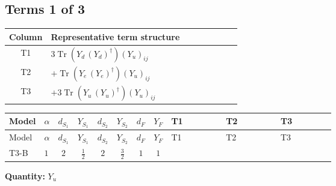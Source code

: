 \documentclass[8pt]{article}
\begin{document}
\begin{landscape}
\subsection*{Terms 1 of 3}
\begin{center}
\begin{tabular}{@{}c >{\raggedright\arraybackslash}p{0.82\linewidth}@{}}
\toprule
Column & Representative term structure \\
\midrule
T1 & \(\displaystyle 3 \operatorname{Tr}\!\left({Y_d}\,\left({Y_d}\right)^{\dagger}\right) \left({Y_u}\right)_{ij}\) \\
\midrule
T2 & \(\displaystyle +\operatorname{Tr}\!\left({Y_e}\,\left({Y_e}\right)^{\dagger}\right) \left({Y_u}\right)_{ij}\) \\
\midrule
T3 & \(\displaystyle +3 \operatorname{Tr}\!\left({Y_u}\,\left({Y_u}\right)^{\dagger}\right) \left({Y_u}\right)_{ij}\) \\
\midrule
\bottomrule
\end{tabular}
\end{center}
\smallskip
\tiny
\begin{longtable}{@{}llcccccc >{\raggedright\arraybackslash}p{0.21\linewidth} >{\raggedright\arraybackslash}p{0.21\linewidth} >{\raggedright\arraybackslash}p{0.21\linewidth}@{}}
\toprule
Model & $\alpha$ & $d_{S_1}$ & $Y_{S_1}$ & $d_{S_2}$ & $Y_{S_2}$ & $d_F$ & $Y_F$ & T1 & T2 & T3 \\
\midrule
\endfirsthead
\toprule
Model & $\alpha$ & $d_{S_1}$ & $Y_{S_1}$ & $d_{S_2}$ & $Y_{S_2}$ & $d_F$ & $Y_F$ & T1 & T2 & T3 \\
\midrule
\endhead
T3-B & $1$ & $2$ & $\frac{1}{2}$ & $2$ & $\frac{3}{2}$ & $1$ & $1$ & \scriptsize\adjustbox{max width=\linewidth}{$\begin{gathered} 3 \operatorname{Tr}\!\left({Y_d}\,\left({Y_d}\right)^{\dagger}\right) \left({Y_u}\right)_{ij}\end{gathered}$} & \scriptsize\adjustbox{max width=\linewidth}{$\begin{gathered} +\operatorname{Tr}\!\left({Y_e}\,\left({Y_e}\right)^{\dagger}\right) \left({Y_u}\right)_{ij}\end{gathered}$} & \scriptsize\adjustbox{max width=\linewidth}{$\begin{gathered} +3 \operatorname{Tr}\!\left({Y_u}\,\left({Y_u}\right)^{\dagger}\right) \left({Y_u}\right)_{ij}\end{gathered}$} \\
\midrule
\bottomrule
\end{longtable}
\clearpage
\noindent\textbf{Quantity: }$Y_u$\par\smallskip

\end{landscape}
\end{document}
